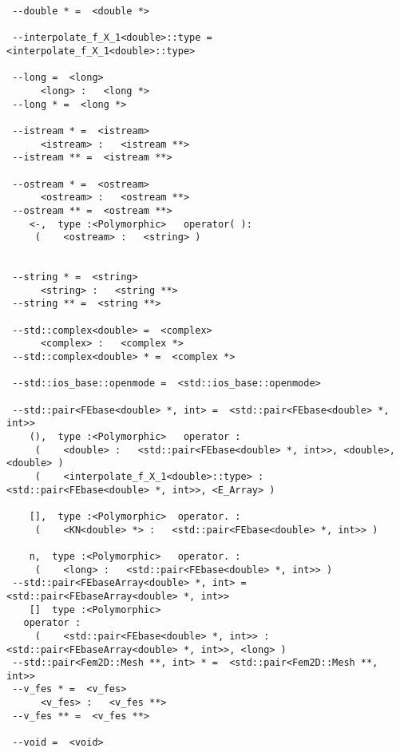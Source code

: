 \documentclass[twoside]{book}
\begin{document}
\begin{verbatim}
 --double * =  <double *>

 --interpolate_f_X_1<double>::type =  <interpolate_f_X_1<double>::type>

 --long =  <long>
	  <long> :   <long *> 
 --long * =  <long *>

 --istream * =  <istream>
	  <istream> :   <istream **> 
 --istream ** =  <istream **>

 --ostream * =  <ostream>
	  <ostream> :   <ostream **> 
 --ostream ** =  <ostream **>
    <-,  type :<Polymorphic>   operator( ): 
	 (	  <ostream> :   <string> )


 --string * =  <string>
	  <string> :   <string **> 
 --string ** =  <string **>

 --std::complex<double> =  <complex>
	  <complex> :   <complex *> 
 --std::complex<double> * =  <complex *>

 --std::ios_base::openmode =  <std::ios_base::openmode>

 --std::pair<FEbase<double> *, int> =  <std::pair<FEbase<double> *, int>>
    (),  type :<Polymorphic>   operator : 
	 (	  <double> :   <std::pair<FEbase<double> *, int>>, <double>, <double> )
	 (	  <interpolate_f_X_1<double>::type> :   <std::pair<FEbase<double> *, int>>, <E_Array> )

    [],  type :<Polymorphic>  operator. : 
	 (	  <KN<double> *> :   <std::pair<FEbase<double> *, int>> )

    n,  type :<Polymorphic>   operator. : 
	 (	  <long> :   <std::pair<FEbase<double> *, int>> )
 --std::pair<FEbaseArray<double> *, int> =  <std::pair<FEbaseArray<double> *, int>>
    []  type :<Polymorphic>
   operator : 
	 (	  <std::pair<FEbase<double> *, int>> :   <std::pair<FEbaseArray<double> *, int>>, <long> )
 --std::pair<Fem2D::Mesh **, int> * =  <std::pair<Fem2D::Mesh **, int>>
 --v_fes * =  <v_fes>
	  <v_fes> :   <v_fes **> 
 --v_fes ** =  <v_fes **>

 --void =  <void>
\end{verbatim}
\end{document}
